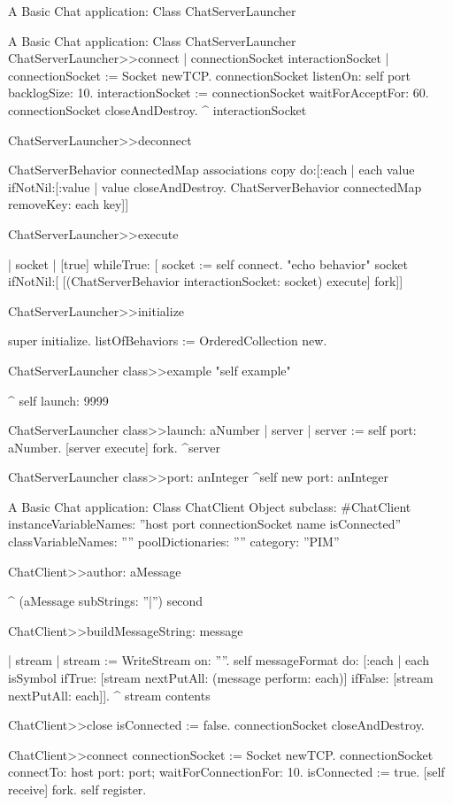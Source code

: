 \documentclass[a4paper,10pt,twoside]{book}
\begin{document}
\begin{script}{A Basic Chat application: Class ChatServerLauncher}
\begin{classdef}{A Basic Chat application: Class ChatServerLauncher}
ChatServerLauncher>>connect
	| connectionSocket interactionSocket |
	connectionSocket := Socket newTCP.
	connectionSocket listenOn: self port backlogSize: 10.
	interactionSocket := connectionSocket waitForAcceptFor: 60.
	connectionSocket closeAndDestroy.
	^ interactionSocket

ChatServerLauncher>>deconnect

	ChatServerBehavior connectedMap associations copy do:[:each |
		each value ifNotNil:[:value |
			value closeAndDestroy.
			ChatServerBehavior connectedMap removeKey: each key]]

ChatServerLauncher>>execute

	| socket |
	[true]
		whileTrue: [
			socket := self connect.
			"echo behavior"
			socket ifNotNil:[
				[(ChatServerBehavior interactionSocket: socket) execute] fork]]

ChatServerLauncher>>initialize

	super initialize.
	listOfBehaviors := OrderedCollection new.

ChatServerLauncher class>>example
	"self example"

	^ self launch: 9999

ChatServerLauncher class>>launch: aNumber
	| server |
	server := self port: aNumber.
	[server execute] fork.
	^server

ChatServerLauncher class>>port: anInteger
	^self new port: anInteger

\end{classdef}


\begin{classdef}{A Basic Chat application: Class ChatClient}
Object subclass: #ChatClient
	instanceVariableNames: ''host port connectionSocket name isConnected''
	classVariableNames: ''''
	poolDictionaries: ''''
	category: ''PIM''

ChatClient>>author: aMessage

	^ (aMessage subStrings: ''|'') second 

ChatClient>>buildMessageString: message

	| stream |
	stream := WriteStream on: ''''.
	self messageFormat do: [:each |
		each isSymbol
			ifTrue: [stream nextPutAll: (message perform: each)]
			ifFalse: [stream nextPutAll: each]].
	^ stream contents

ChatClient>>close
	isConnected := false.
	connectionSocket closeAndDestroy.

ChatClient>>connect
	connectionSocket := Socket newTCP.	
	connectionSocket 
		connectTo: host port: port; 
		waitForConnectionFor: 10.
	isConnected := true.
	[self receive] fork.
	self register.


\end{classdef}
\end{script}
\end{document}
